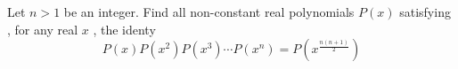 Let $n>1$ be an integer. Find all non-constant real polynomials $P(x)$ satisfying , for any real $x$ , the identy \[P(x)P(x^2)P(x^3)\cdots P(x^n)=P(x^{\frac{n(n+1)}{2}})\]